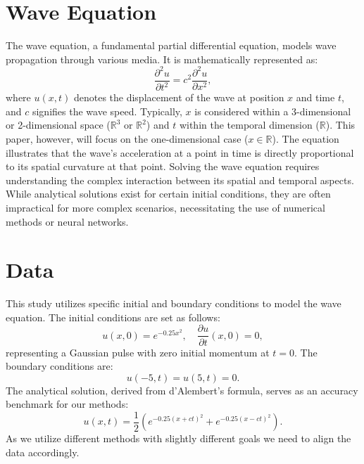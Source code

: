 \documentclass[twoside,11pt]{report}
\begin{document}
\section{Wave Equation}
\label{sec:wave}

    The wave equation, a fundamental partial differential equation, models wave propagation through 
    various media. It is mathematically represented as:
    \begin{equation}
    \frac{\partial^2 u}{\partial t^2} = c^2 \frac{\partial^2 u}{\partial x^2},
    \end{equation}
    where $u(x,t)$ denotes the displacement of the wave at position $x$ and time $t$, and $c$  
    signifies the wave speed. Typically, $x$ is considered within a 3-dimensional or 2-dimensional 
    space ($\mathbb{R}^3$ or $\mathbb{R}^2$) and $t$ within the temporal dimension ($\mathbb{R}$). 
    This paper, however, will focus on the one-dimensional case ($x \in \mathbb{R}$).
    The equation illustrates that the wave's acceleration at a point in time is directly proportional to 
    its spatial curvature at that point. Solving the wave equation requires understanding the complex 
    interaction between its spatial and temporal aspects. While analytical solutions exist for certain 
    initial conditions, they are often impractical for more complex scenarios, necessitating the use of 
    numerical methods or neural networks.

\section{Data}
\label{sec:data}

    This study utilizes specific initial and boundary conditions to model the wave equation. 
    The initial conditions are set as follows:
    \begin{equation}
    u(x,0) = e^{-0.25x^2},
    \quad \frac{\partial u}{\partial t}(x,0) = 0,
    \end{equation}
    representing a Gaussian pulse with zero initial momentum at $t=0$. 
    The boundary conditions are:
    \begin{equation}
    u(-5,t) = u(5,t) = 0.
    \end{equation}
    The analytical solution, derived from d'Alembert’s formula, serves as an accuracy benchmark for our methods:
    \begin{equation}
    u(x,t) = \frac{1}{2}(e^{-0.25(x+ct)^2} + e^{-0.25(x-ct)^2}).
    \end{equation}
    As we utilize different methods with slightly different goals we need to align the data accordingly.
\end{document}
